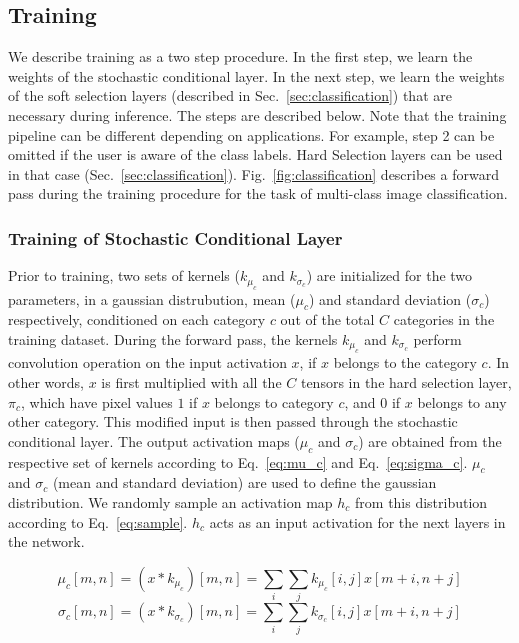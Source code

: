\documentclass[12pt, letterpaper]{article}
\begin{document}
\subsection{Training} 
We describe training as a two step procedure. In the first step, we learn the weights of the stochastic conditional layer. In the next step, we learn the weights of the soft selection layers (described in Sec.~\ref{sec:classification}) that are necessary during inference. The steps are described below. Note that the training pipeline can be different depending on applications. For example, step 2 can be omitted if the user is aware of the class labels. Hard Selection layers can be used in that case (Sec.~\ref{sec:classification}). Fig.~\ref{fig:classification} describes a forward pass during the training procedure for the task of multi-class image classification.

\subsubsection{Training of Stochastic Conditional Layer}
Prior to training, two sets of kernels ($k_{\mu_c}$ and $k_{\sigma_c}$) are initialized for the two parameters, in a gaussian distrubution, mean ($\mu_c$) and standard deviation ($\sigma_c$) respectively, conditioned on each category $c$ out of the total $C$ categories in the training dataset. During the forward pass, the kernels $k_{\mu_c}$ and $k_{\sigma_c}$ perform convolution operation on the input activation $x$, if $x$ belongs to the category $c$. In other words, $x$ is first multiplied with all the $C$ tensors in the hard selection layer, $\pi_c$, which have pixel values $1$ if $x$ belongs to category $c$, and $0$ if $x$ belongs to any other category. This modified input is then passed through the stochastic conditional layer. The output activation maps ($\mu_c$ and $\sigma_c$) are obtained from the respective set of kernels according to Eq.~\eqref{eq:mu_c} and Eq.~\eqref{eq:sigma_c}. $\mu_c$ and $\sigma_c$ (mean and standard deviation) are used to define the gaussian distribution. We randomly sample an activation map  $h_c$ from this distribution according to Eq.~\eqref{eq:sample}. $h_c$ acts as an input activation for the next layers in the network. 

\begin{equation}
  \mu_c[m,n]=(x * k_{\mu_c})[m,n]=\sum_i \sum_j k_{\mu_c}[i,j]x[m+i,n+j]
  \label{eq:mu_c}
\end{equation}
\begin{equation}
  \sigma_c[m,n]=(x * k_{\sigma_c})[m,n]=\sum_i \sum_j k_{\sigma_c}[i,j]x[m+i,n+j]
  \label{eq:sigma_c}
\end{equation}
\end{document}
